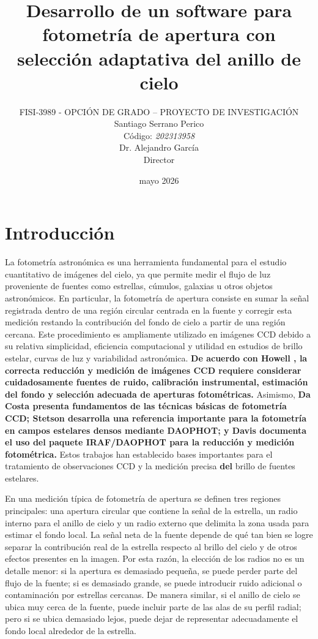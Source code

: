 \documentclass[9pt]{extarticle}
\title{Desarrollo de un software para fotometría de apertura con selección adaptativa del anillo de cielo}
\author{FISI-3989 - OPCIÓN DE GRADO – PROYECTO DE INVESTIGACIÓN\\
Santiago Serrano Perico\\
Código: \textit{202313958}\\[0.4cm]
Dr. Alejandro García\\
Director
}
\date{mayo 2026}
\begin{document}
\maketitle

\section{Introducción}

La fotometría astronómica es una herramienta fundamental para el estudio cuantitativo de imágenes del cielo, ya que permite medir el flujo de luz proveniente de fuentes como estrellas, cúmulos, galaxias u otros objetos astronómicos. En particular, la fotometría de apertura consiste en sumar la señal registrada dentro de una región circular centrada en la fuente y corregir esta medición restando la contribución del fondo de cielo a partir de una región cercana. Este procedimiento es ampliamente utilizado en imágenes CCD debido a su relativa simplicidad, eficiencia computacional y utilidad en estudios de brillo estelar, curvas de luz y variabilidad astronómica. \textbf{De acuerdo con Howell \cite{howell2006handbook}, la correcta reducción y medición de imágenes CCD requiere considerar cuidadosamente fuentes de ruido, calibración instrumental, estimación del fondo y selección adecuada de aperturas fotométricas.} Asimismo, \textbf{Da Costa \cite{dacosta1992basic} presenta fundamentos de las técnicas básicas de fotometría CCD; Stetson \cite{stetson1987daophot} desarrolla una referencia importante para la fotometría en campos estelares densos mediante DAOPHOT; y Davis \cite{davis1994iraf} documenta el uso del paquete IRAF/DAOPHOT para la reducción y medición fotométrica.} Estos trabajos han establecido bases importantes para el tratamiento de observaciones CCD y la medición precisa \textbf{del} brillo de fuentes estelares.

En una medición típica de fotometría de apertura se definen tres regiones principales: una apertura circular que contiene la señal de la estrella, un radio interno para el anillo de cielo y un radio externo que delimita la zona usada para estimar el fondo local. La señal neta de la fuente depende de qué tan bien se logre separar la contribución real de la estrella respecto al brillo del cielo y de otros efectos presentes en la imagen. Por esta razón, la elección de los radios no es un detalle menor: si la apertura es demasiado pequeña, se puede perder parte del flujo de la fuente; si es demasiado grande, se puede introducir ruido adicional o contaminación por estrellas cercanas. De manera similar, si el anillo de cielo se ubica muy cerca de la fuente, puede incluir parte de las alas de su perfil radial; pero si se ubica demasiado lejos, puede dejar de representar adecuadamente el fondo local alrededor de la estrella.
\end{document}
